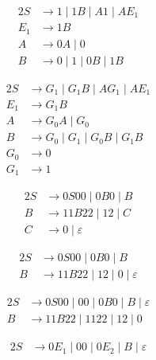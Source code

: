 \documentclass[docid=TP10]{tcom_TP}
\begin{document}
{\begin{minipage}[c]{0.25\textwidth} \begin{alignat*}{2}
	S &\rightarrow 1\mid 1B\mid A1\mid AE_1 \\
	E_1 &\rightarrow 1B\\
	A &\rightarrow 0A\mid 0\\
	B &\rightarrow 0\mid 1\mid 0B\mid 1B
\end{alignat*} \end{minipage}
\begin{alignat*}{2}
	S &\rightarrow G_1\mid G_1B\mid AG_1\mid AE_1 \\
	E_1 &\rightarrow G_1B\\
	A &\rightarrow G_0A\mid G_0\\
	B &\rightarrow G_0\mid G_1\mid G_0B\mid G_1B\\
	G_0 &\rightarrow 0\\
	G_1 &\rightarrow 1
\end{alignat*}
\begin{center}
\begin{minipage}[c]{0.3\textwidth} \begin{alignat*}{2}
	S &\rightarrow 0S00\mid 0B0\mid B\\
	B &\rightarrow 11B22\mid 12\mid C\\
	C &\rightarrow 0\mid \varepsilon
\end{alignat*} \end{minipage}%
\begin{minipage}[c]{0.3\textwidth} \begin{alignat*}{2}
	S &\rightarrow 0S00\mid 0B0\mid B\\
	B &\rightarrow 11B22\mid 12\mid 0\mid \varepsilon
\end{alignat*} \end{minipage}%
\begin{minipage}[c]{0.4\textwidth} \begin{alignat*}{2}
	S &\rightarrow 0S00\mid 00\mid 0B0\mid B\mid \varepsilon\\
	B &\rightarrow 11B22\mid 1122\mid 12\mid 0
\end{alignat*} \end{minipage}
\end{center}
\begin{center}
\begin{minipage}[c]{0.3\textwidth} \begin{alignat*}{2}
	S &\rightarrow 0E_1\mid 00\mid 0E_2\mid B\mid \varepsilon\\

\end{alignat*}
\end{minipage}
\end{center}}
\end{document}
